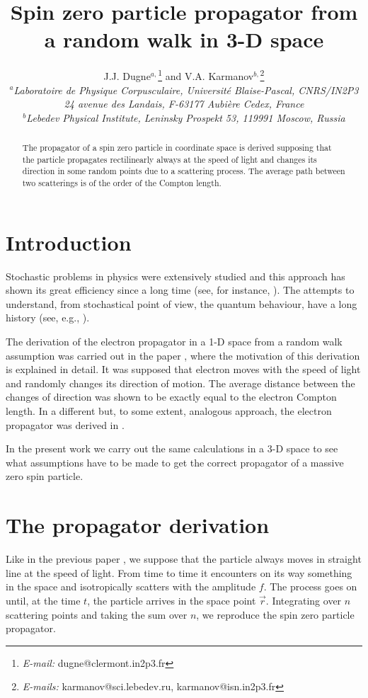 \documentclass[a4paper,12pt]{article}
\title{\bf Spin zero particle propagator from a random walk in 3-D space}
\author{J.J. Dugne$^{a,}$\thanks{\textit{E-mail:} dugne@clermont.in2p3.fr}
\quad and \quad
V.A. Karmanov$^{b,}$\thanks{\textit{E-mails:} karmanov@sci.lebedev.ru,
karmanov@isn.in2p3.fr}\\
$^a${\small \em Laboratoire de Physique Corpusculaire,
Universit\'e Blaise-Pascal, CNRS/IN2P3}
\\{\small \em 24 avenue des Landais, F-63177 Aubi\`ere Cedex, France}\\
$^b${\small \em Lebedev Physical Institute, Leninsky Prospekt 53, 119991
Moscow, Russia}}
\date{}
\begin{document}

\maketitle
\begin{abstract}
The  propagator of a spin zero particle in coordinate space is
derived supposing that the
particle propagates rectilinearly always at the speed of light and  changes its
direction in some random points due to a  scattering process. The
average path between two scatterings  is of the order of
the Compton length.
\end{abstract}





\section{Introduction}
Stochastic  problems in physics were extensively studied and this
approach has shown its great efficiency since a long time (see,
for instance, \cite{Chandrasekhar}). The attempts to understand,
from stochastical point of view, the quantum behaviour, have a
long history (see, e.g., \cite{Bohm52,Nelson84}).

The derivation of the  electron propagator in a 1-D space from a
random walk  assumption was carried out in the paper
\cite{Karmanov93}, where the motivation of this derivation is
explained in detail. It was supposed that electron moves with the
speed of light and randomly changes its direction of motion. The
average distance between the changes of direction was shown to be
exactly equal to the electron Compton length.  In a different but,
to some extent, analogous  approach, the electron propagator was
derived in  \cite{Riazanov58}.

In the present work we carry out the same calculations in a 3-D
space to see what assumptions have to be made to get  the correct
propagator of a massive zero spin particle.

\section{The propagator derivation}\label{prop}
Like  in the previous paper \cite{Karmanov93}, we suppose that the
particle  always moves in straight line at the speed of light.
 From time to time it encounters on its way something in the space  and
isotropically scatters with the amplitude $f$.  The process goes on until, at
the time $t$, the particle arrives in the space point $\vec{r}$. Integrating
over $n$  scattering points and taking the sum over $n$, we reproduce the spin
zero particle propagator.
\end{document}
